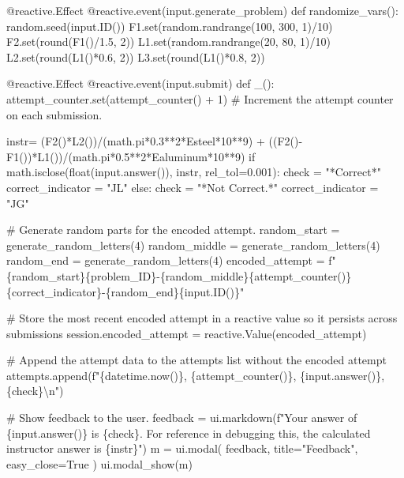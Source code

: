 \documentclass[
  letterpaper,
  DIV=11,
  numbers=noendperiod]{scrreprt}
\newenvironment{Shaded}{\begin{snugshade}}{\end{snugshade}}
\newcommand{\NormalTok}[1]{\textcolor[rgb]{0.00,0.23,0.31}{#1}}
\begin{document}
\begin{Shaded}
\begin{Highlighting}[]
\NormalTok{    @reactive.Effect}
\NormalTok{    @reactive.event(input.generate\_problem)}
\NormalTok{    def randomize\_vars():}
\NormalTok{        random.seed(input.ID())}
\NormalTok{        F1.set(random.randrange(100, 300, 1)/10)}
\NormalTok{        F2.set(round(F1()/1.5, 2))}
\NormalTok{        L1.set(random.randrange(20, 80, 1)/10)}
\NormalTok{        L2.set(round(L1()*0.6, 2))}
\NormalTok{        L3.set(round(L1()*0.8, 2))}
        

\NormalTok{    @reactive.Effect}
\NormalTok{    @reactive.event(input.submit)}
\NormalTok{    def \_():}
\NormalTok{        attempt\_counter.set(attempt\_counter() + 1)  \# Increment the attempt counter on each submission.}
       
\NormalTok{        instr= (F2()*L2())/(math.pi*0.3**2*Esteel*10**9) + ((F2(){-}F1())*L1())/(math.pi*0.5**2*Ealuminum*10**9)}
\NormalTok{        if math.isclose(float(input.answer()), instr, rel\_tol=0.001):}
\NormalTok{            check = "*Correct*"}
\NormalTok{            correct\_indicator = "JL"}
\NormalTok{        else:}
\NormalTok{            check = "*Not Correct.*"}
\NormalTok{            correct\_indicator = "JG"}

\NormalTok{        \# Generate random parts for the encoded attempt.}
\NormalTok{        random\_start = generate\_random\_letters(4)}
\NormalTok{        random\_middle = generate\_random\_letters(4)}
\NormalTok{        random\_end = generate\_random\_letters(4)}
\NormalTok{        encoded\_attempt = f"\{random\_start\}\{problem\_ID\}{-}\{random\_middle\}\{attempt\_counter()\}\{correct\_indicator\}{-}\{random\_end\}\{input.ID()\}"}

\NormalTok{        \# Store the most recent encoded attempt in a reactive value so it persists across submissions}
\NormalTok{        session.encoded\_attempt = reactive.Value(encoded\_attempt)}

\NormalTok{        \# Append the attempt data to the attempts list without the encoded attempt}
\NormalTok{        attempts.append(f"\{datetime.now()\}, \{attempt\_counter()\}, \{input.answer()\}, \{check\}\textbackslash{}n")}

\NormalTok{        \# Show feedback to the user.}
\NormalTok{        feedback = ui.markdown(f"Your answer of \{input.answer()\} is \{check\}. For reference in debugging this, the calculated instructor answer is \{instr\}")}
\NormalTok{        m = ui.modal(}
\NormalTok{            feedback,}
\NormalTok{            title="Feedback",}
\NormalTok{            easy\_close=True}
\NormalTok{        )}
\NormalTok{        ui.modal\_show(m)}


\end{Highlighting}
\end{Shaded}
\end{document}
